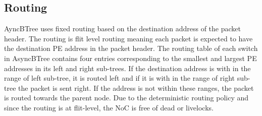 \subsection{Routing}
\label{sec:routing}
AyncBTree uses fixed routing based on the destination address of the packet header.
The routing is flit level routing meaning each packet is expected to have the destination PE address in the packet header.
The routing table of each switch in AsyncBTree contains four entries corresponding to the smallest and largest PE addresses in its left and right sub-trees.
If the destination address is with in the range of left sub-tree, it is routed left and if it is with in the range of right sub-tree the packet is sent right.
If the address is not within these ranges, the packet is routed towards the parent node.
Due to the deterministic routing policy and since the routing is at flit-level, the NoC is free of dead or livelocks.

%


